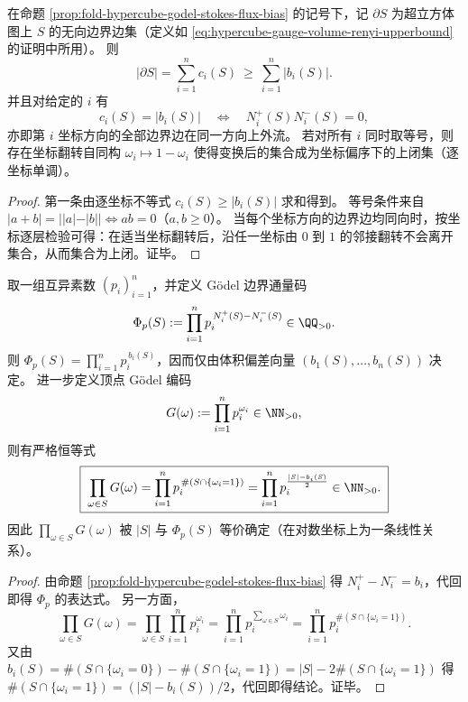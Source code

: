 \begin{corollary}\label{cor:fold-hypercube-boundary-l1-bias-monotone}
在命题 \ref{prop:fold-hypercube-godel-stokes-flux-bias} 的记号下，记 \(\partial S\) 为超立方体图上 \(S\) 的无向边界边集（定义如 \eqref{eq:hypercube-gauge-volume-renyi-upperbound} 的证明中所用）。
则
\[
|\partial S|=\sum_{i=1}^n c_i(S)\ \ge\ \sum_{i=1}^n |b_i(S)|.
\]
并且对给定的 \(i\) 有
\[
c_i(S)=|b_i(S)|
\quad\Longleftrightarrow\quad
N_i^+(S)N_i^-(S)=0,
\]
亦即第 \(i\) 坐标方向的全部边界边在同一方向上外流。
若对所有 \(i\) 同时取等号，则存在坐标翻转自同构
\(
\omega_i\mapsto 1-\omega_i
\)
使得变换后的集合成为坐标偏序下的上闭集（逐坐标单调）。
\end{corollary}
\begin{proof}
第一条由逐坐标不等式 \(c_i(S)\ge |b_i(S)|\) 求和得到。
等号条件来自 \(|a+b|=||a|-|b||\iff ab=0\)（\(a,b\ge 0\)）。
当每个坐标方向的边界边均同向时，按坐标逐层检验可得：在适当坐标翻转后，沿任一坐标由 \(0\) 到 \(1\) 的邻接翻转不会离开集合，从而集合为上闭。证毕。
\end{proof}

\begin{proposition}\label{prop:fold-hypercube-godel-flux-multiplicative-volume}
取一组互异素数 \((p_i)_{i=1}^n\)，并定义 Gödel 边界通量码
\[
\Phi_p(S):=\prod_{i=1}^n p_i^{\,N_i^+(S)-N_i^-(S)}\in\QQ_{>0}.
\]
则 \(\Phi_p(S)=\prod_{i=1}^n p_i^{\,b_i(S)}\)，因而仅由体积偏差向量 \((b_1(S),\dots,b_n(S))\) 决定。
进一步定义顶点 Gödel 编码
\[
G(\omega):=\prod_{i=1}^n p_i^{\omega_i}\in\NN_{>0},
\]
则有严格恒等式
\[
\boxed{\;
\prod_{\omega\in S}G(\omega)
=\prod_{i=1}^n p_i^{\,\#(S\cap\{\omega_i=1\})}
=\prod_{i=1}^n p_i^{\frac{|S|-b_i(S)}{2}}\in\NN_{>0}.
\;}
\]
因此 \(\prod_{\omega\in S}G(\omega)\) 被 \(|S|\) 与 \(\Phi_p(S)\) 等价确定（在对数坐标上为一条线性关系）。
\end{proposition}
\begin{proof}
由命题 \ref{prop:fold-hypercube-godel-stokes-flux-bias} 得 \(N_i^+-N_i^-=b_i\)，代回即得 \(\Phi_p\) 的表达式。
另一方面，
\[
\prod_{\omega\in S}G(\omega)
=\prod_{\omega\in S}\prod_{i=1}^n p_i^{\omega_i}
=\prod_{i=1}^n p_i^{\sum_{\omega\in S}\omega_i}
=\prod_{i=1}^n p_i^{\#(S\cap\{\omega_i=1\})}.
\]
又由
\(
b_i(S)=\#(S\cap\{\omega_i=0\})-\#(S\cap\{\omega_i=1\})=|S|-2\#(S\cap\{\omega_i=1\})
\)
得 \(\#(S\cap\{\omega_i=1\})=(|S|-b_i(S))/2\)，代回即得结论。证毕。
\end{proof}

